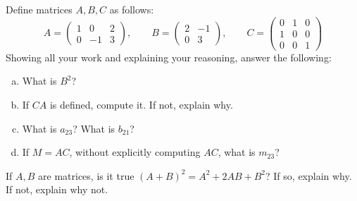 \documentclass[11pt,letterpaper]{article}
\begin{document}
 Define matrices $A, B, C$ as follows:
	\[
	A= \begin{pmatrix} 1 & 0 & 2 \\ 0 & -1 & 3 \end{pmatrix}, \qquad B= \begin{pmatrix} 2 & -1 \\ 0 & 3 \end{pmatrix}, \qquad C= \begin{pmatrix} 0 & 1 & 0 \\ 1 & 0 & 0 \\ 0 & 0 & 1 \end{pmatrix}
	\]
Showing all your work and explaining your reasoning, answer the following:
        \begin{enumerate}[(a)]
        \item What is $B^2$?
        \item If $CA$ is defined, compute it. If not, explain why. 
        \item What is $a_{23}$? What is $b_{21}$?
        \item If $M= AC$, without explicitly computing $AC$, what is $m_{23}$?
        \end{enumerate}



\newpage



 If $A, B$ are matrices, is it true $(A + B)^2= A^2 + 2AB + B^2$? If so, explain why. If not, explain why not. 
\end{document}
